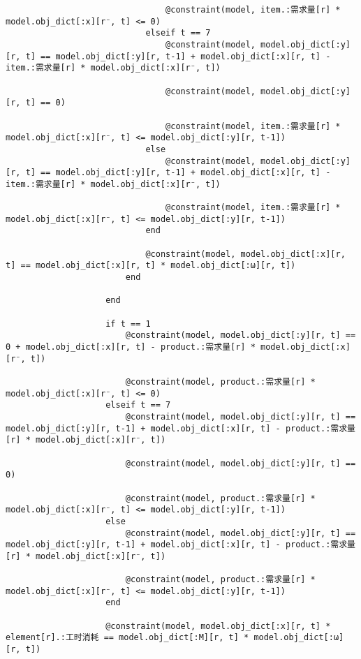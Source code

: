 \begin{appendices}
\begin{lstlisting}
                                @constraint(model, item.:需求量[r] * model.obj_dict[:x][r⁻, t] <= 0)
                            elseif t == 7
                                @constraint(model, model.obj_dict[:y][r, t] == model.obj_dict[:y][r, t-1] + model.obj_dict[:x][r, t] - item.:需求量[r] * model.obj_dict[:x][r⁻, t])

                                @constraint(model, model.obj_dict[:y][r, t] == 0)

                                @constraint(model, item.:需求量[r] * model.obj_dict[:x][r⁻, t] <= model.obj_dict[:y][r, t-1])
                            else
                                @constraint(model, model.obj_dict[:y][r, t] == model.obj_dict[:y][r, t-1] + model.obj_dict[:x][r, t] - item.:需求量[r] * model.obj_dict[:x][r⁻, t])

                                @constraint(model, item.:需求量[r] * model.obj_dict[:x][r⁻, t] <= model.obj_dict[:y][r, t-1])
                            end

                            @constraint(model, model.obj_dict[:x][r, t] == model.obj_dict[:x][r, t] * model.obj_dict[:ω][r, t])
                        end

                    end

                    if t == 1
                        @constraint(model, model.obj_dict[:y][r, t] == 0 + model.obj_dict[:x][r, t] - product.:需求量[r] * model.obj_dict[:x][r⁻, t])

                        @constraint(model, product.:需求量[r] * model.obj_dict[:x][r⁻, t] <= 0)
                    elseif t == 7
                        @constraint(model, model.obj_dict[:y][r, t] == model.obj_dict[:y][r, t-1] + model.obj_dict[:x][r, t] - product.:需求量[r] * model.obj_dict[:x][r⁻, t])

                        @constraint(model, model.obj_dict[:y][r, t] == 0)

                        @constraint(model, product.:需求量[r] * model.obj_dict[:x][r⁻, t] <= model.obj_dict[:y][r, t-1])
                    else
                        @constraint(model, model.obj_dict[:y][r, t] == model.obj_dict[:y][r, t-1] + model.obj_dict[:x][r, t] - product.:需求量[r] * model.obj_dict[:x][r⁻, t])

                        @constraint(model, product.:需求量[r] * model.obj_dict[:x][r⁻, t] <= model.obj_dict[:y][r, t-1])
                    end

                    @constraint(model, model.obj_dict[:x][r, t] * element[r].:工时消耗 == model.obj_dict[:M][r, t] * model.obj_dict[:ω][r, t])


\end{lstlisting}
\end{appendices}
